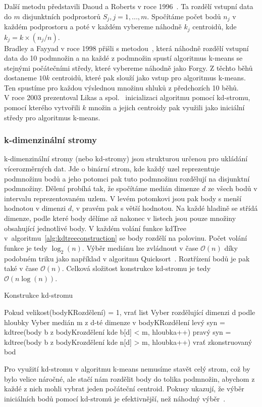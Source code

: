 Další metodu představili Daoud a Roberts v roce 1996~\cite{daoud96}. Ta rozdělí vstupní data do $m$ disjunktních podprostorů $S_j, j = 1,...,m$. Spočítáme počet bodů $n_j$ v každém podprostoru a poté v každém vybereme náhodně $k_j$ centroidů, kde $k_j = k \times (n_j/n)$.\\

Bradley a Fayyad v roce 1998 přišli s metodou~\cite{bradley98}, která náhodně rozdělí vstupní data do 10 podmnožin a na každé z podmnožin spustí algoritmus k-means se stejnými počátečními středy, které vybereme náhodně jako Forgy. Z těchto běhů dostaneme $10k$ centroidů, které pak slouží jako vstup pro algoritmus k-means. Ten spustíme pro každou výslednou množinu shluků z předchozích 10 běhů.\\

V roce 2003 prezentoval Likas a spol.~\cite{likas03} inicializaci algoritmu pomocí kd-stromu, pomocí kterého vytvořili $k$ množin a jejich centroidy pak využili jako iniciální středy pro algoritmus k-means.

\subsubsection{k-dimenzinální stromy}\label{sssec:kdtrees}
k-dimenzinální stromy (nebo kd-stromy) jsou strukturou určenou pro ukládání vícerozměrných dat. Jde o binární strom, kde každý uzel reprezentuje podmnožinu bodů a jeho potomci pak tuto podmnožinu rozdělují na disjunktní podmnožiny. Dělení probíhá tak, že spočítáme medián dimenze $d$ ze všech bodů v intervalu reprezentovaném uzlem. V levém potomkovi jsou pak body s menší hodnotou v dimenzi $d$, v pravém pak s větší hodnotou. Na každé hladině se střídá dimenze, podle které body dělíme až nakonec v listech jsou pouze množiny obsahující jednotlivé body. V každém volání funkce kdTree v~algoritmu~\ref{alg:kdtreeconstruction} se body rozdělí na polovinu. Počet volání funkce je tedy $\log_2(n)$. Výběr mediánu lze zvládnout v čase $\mathcal{O}(n)$ díky podobném triku jako například v algoritmu Quicksort~\cite{Cormen07}. Roztřízení bodů je pak také v čase $\mathcal{O}(n)$. Celková složitost konstrukce kd-stromu je tedy $\mathcal{O}(n \log(n))$.

\begin{algorithm}
\caption{Konstrukce kd-stromu}\label{alg:kdtreeconstruction}
\begin{algorithmic}[1]
\State Pokud velikost(bodyKRozdělení) = 1, vrať list
\State Vyber rozdělující dimenzi d podle hloubky
\State Vyber medián m z d-té dimenze v bodyKRozdělení
\State levý syn = kdtree(body b z bodyKrozdělení kde b[d] < m, hloubka++)
\State pravý syn = kdtree(body b z bodyKrozdělení kde n[d] > m, hloubka++)
\State vrať zkonstruovaný bod
\EndFunction
\end{algorithmic}
\end{algorithm}

Pro využití kd-stromu v algoritmu k-means nemusíme stavět celý strom, což by bylo velice náročné, ale stačí nám rozdělit body do tolika podmnožin, abychom z každé z nich mohli vybrat jeden počáteční centroid. Pokusy ukazují, že výběr iniciálních bodů pomocí kd-stromů je efektivnější, než náhodný výběr~\cite{Pahala10}.
